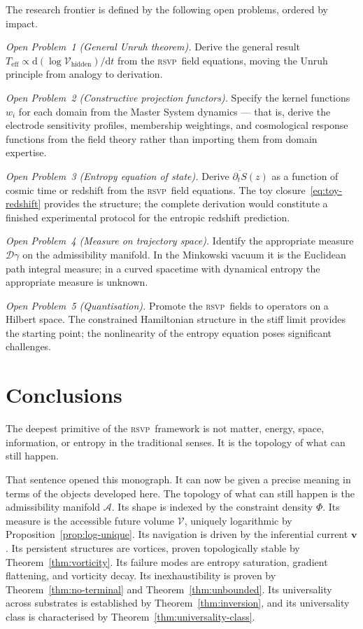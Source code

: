 \documentclass[12pt, oneside]{book}
\theoremstyle{plain}
\theoremstyle{definition}
\newcommand{\vfield}{\mathbf{v}}
\newcommand{\RSVP}{\textsc{rsvp}}
\newcommand{\dd}{\mathrm{d}}
\newcommand{\Vac}{\mathcal{V}}
\newcommand{\Adm}{\mathcal{A}}
\begin{document}
The research frontier is defined by the following open problems, ordered by impact.

\textit{Open Problem~1 (General Unruh theorem).} Derive the general result
$T_{\mathrm{eff}} \propto \dd(\log\Vac_{\mathrm{hidden}})/\dd t$ from the \RSVP\
field equations, moving the Unruh principle from analogy to derivation.

\textit{Open Problem~2 (Constructive projection functors).} Specify the kernel
functions $w_i$ for each domain from the Master System dynamics --- that is, derive
the electrode sensitivity profiles, membership weightings, and cosmological response
functions from the field theory rather than importing them from domain expertise.

\textit{Open Problem~3 (Entropy equation of state).} Derive $\overline{\partial_t S}(z)$
as a function of cosmic time or redshift from the \RSVP\ field equations. The toy
closure~\eqref{eq:toy-redshift} provides the structure; the complete derivation
would constitute a finished experimental protocol for the entropic redshift
prediction.

\textit{Open Problem~4 (Measure on trajectory space).} Identify the appropriate
measure $\mathcal{D}\gamma$ on the admissibility manifold. In the Minkowski vacuum
it is the Euclidean path integral measure; in a curved spacetime with dynamical
entropy the appropriate measure is unknown.

\textit{Open Problem~5 (Quantisation).} Promote the \RSVP\ fields to operators on
a Hilbert space. The constrained Hamiltonian structure in the stiff limit provides
the starting point; the nonlinearity of the entropy equation poses significant
challenges.

\chapter{Conclusions}
\label{ch:conclusions}

The deepest primitive of the \RSVP\ framework is not matter, energy, space,
information, or entropy in the traditional senses. It is the topology of what can
still happen.

That sentence opened this monograph. It can now be given a precise meaning in terms
of the objects developed here. The topology of what can still happen is the
admissibility manifold $\Adm$. Its shape is indexed by the constraint density $\Phi$.
Its measure is the accessible future volume $\Vac$, uniquely logarithmic by
Proposition~\ref{prop:log-unique}. Its navigation is driven by the inferential
current $\vfield$. Its persistent structures are vortices, proven topologically
stable by Theorem~\ref{thm:vorticity}. Its failure modes are entropy saturation,
gradient flattening, and vorticity decay. Its inexhaustibility is proven by
Theorem~\ref{thm:no-terminal} and Theorem~\ref{thm:unbounded}. Its universality
across substrates is established by Theorem~\ref{thm:inversion}, and its universality
class is characterised by Theorem~\ref{thm:universality-class}.
\end{document}
